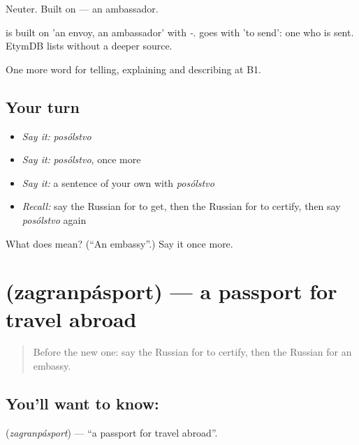 Neuter. Built on \emph{} — an ambassador.

\begin{cousinweb}
\emph{} is built on \emph{} 'an envoy, an ambassador' with \emph{-}. \emph{} goes with \emph{} 'to send': one who is sent. EtymDB lists \emph{} without a deeper source.
\end{cousinweb}

\begin{grammarlens}[title={What you've built}]
One more word for telling, explaining and describing at B1.
\end{grammarlens}

\subsection*{Your turn}
\begin{itemize}
\raggedright
  \item \emph{Say it:} \emph{posólstvo}
  \item \emph{Say it:} \emph{posólstvo}, once more
  \item \emph{Say it:} a sentence of your own with \emph{posólstvo}
  \item \emph{Recall:} say the Russian for to get, then the Russian for to certify, then say \emph{posólstvo} again
\end{itemize}

\begin{tcolorbox}[breakable,colback=teal!4,colframe=teal!35!black,title={Before you move on}]
What does  mean? (\textquotedblleft{}An embassy\textquotedblright{}.) Say it once more.
\end{tcolorbox}
\section[\texorpdfstring{\ru{загранпаспорт} (zagranpásport)}{загранпаспорт (zagranpásport)}]{ (zagranpásport) — a passport for travel abroad}

\label{lesson:RU-C451-zagranpasport}



\begin{quote}
Before the new one: say the Russian for to certify, then the Russian for an embassy.
\end{quote}

\subsection*{You'll want to know: }
\textbf{} (\emph{zagranpásport}) — \textquotedblleft{}a passport for travel abroad\textquotedblright{}.

